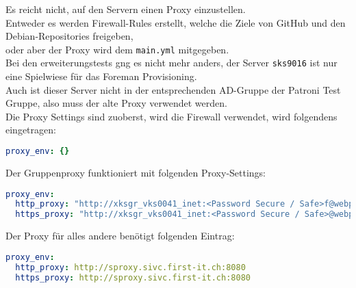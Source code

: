 \begin{flushleft}
    Es reicht nicht, auf den Servern einen Proxy einzustellen.\\
    Entweder es werden Firewall-Rules erstellt, welche die Ziele von \Gls{GitHub} und den \Gls{Debian}-Repositories freigeben,\\
    oder aber der Proxy wird dem \texttt{main.yml} mitgegeben.\\
    Bei den erweiterungstests gng es nicht mehr anders, der Server \texttt{sks9016} ist nur eine Spielwiese für das \Gls{Foreman} Provisioning.\\
    Auch ist dieser Server nicht in der entsprechenden AD-Gruppe der Patroni Test Gruppe, also muss der alte Proxy verwendet werden.\\
    Die Proxy Settings sind zuoberst, wird die Firewall verwendet, wird folgendens eingetragen:
    \lstset{style=gra_codestyle}
    \begin{lstlisting}[language=yaml, caption=main.xyml - No Proxy,captionpos=b,label={lst:main.yml-no-proxy},breaklines=true]
proxy_env: {}
    \end{lstlisting}
    Der Gruppenproxy funktioniert mit folgenden Proxy-Settings:
    \lstset{style=gra_codestyle}
    \begin{lstlisting}[language=yaml, caption=main.xyml - Gruppenproxy,captionpos=b,label={lst:main.yml-webproxy},breaklines=true]
proxy_env:
  http_proxy: "http://xksgr_vks0041_inet:<Password Secure / Safe>f@webproxy.sivc.first-it.ch:9090"
  https_proxy: "http://xksgr_vks0041_inet:<Password Secure / Safe>@webproxy.sivc.first-it.ch:9090"
    \end{lstlisting}
    Der Proxy für alles andere benötigt folgenden Eintrag:
    \lstset{style=gra_codestyle}
    \begin{lstlisting}[language=yaml, caption=main.xyml - SProxy,captionpos=b,label={lst:main.yml-sproxy},breaklines=true]
proxy_env:
  http_proxy: http://sproxy.sivc.first-it.ch:8080
  https_proxy: http://sproxy.sivc.first-it.ch:8080
    \end{lstlisting}
\end{flushleft}
